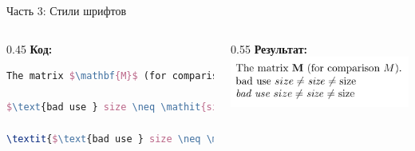 \documentclass[aspectratio=169]{beamer}
\begin{document}
\begin{frame}[fragile]{Часть 3: Стили шрифтов}
    \begin{columns}[T]
        \begin{column}{0.45\textwidth}
            \textbf{Код:}
            \begin{lstlisting}[language=tex]
The matrix $\mathbf{M}$ (for comparison $M$).

$\text{bad use } size \neq \mathit{size} \neq \mathrm{size} $

\textit{$\text{bad use } size \neq \mathit{size} \neq \mathrm{size} $}
            \end{lstlisting}
        \end{column}
        \begin{column}{0.55\textwidth}
            \textbf{Результат:}
            \includegraphics[width=\textwidth, height=0.7\textheight, keepaspectratio]{image/3.png}
        \end{column}
    \end{columns}
\end{frame}
\end{document}
